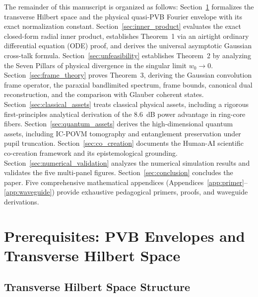\documentclass[11pt,a4paper]{article}
\begin{document}
The remainder of this manuscript is organized as follows: Section~\ref{sec:prerequisites} formalizes the transverse Hilbert space and the physical quasi-PVB Fourier envelope with its exact normalization constant. Section~\ref{sec:inner_product} evaluates the exact closed-form radial inner product, establishes Theorem~1 via an airtight ordinary differential equation (ODE) proof, and derives the universal asymptotic Gaussian cross-talk formula. Section~\ref{sec:unfeasibility} establishes Theorem~2 by analyzing the Seven Pillars of physical divergence in the singular limit $w_0 \to 0$. Section~\ref{sec:frame_theory} proves Theorem~3, deriving the Gaussian convolution frame operator, the paraxial bandlimited spectrum, frame bounds, canonical dual reconstruction, and the comparison with Glauber coherent states. Section~\ref{sec:classical_assets} treats classical physical assets, including a rigorous first-principles analytical derivation of the 8.6~dB power advantage in ring-core fibers. Section~\ref{sec:quantum_assets} derives the high-dimensional quantum assets, including IC-POVM tomography and entanglement preservation under pupil truncation. Section~\ref{sec:co_creation} documents the Human-AI scientific co-creation framework and its epistemological grounding. Section~\ref{sec:numerical_validation} analyzes the numerical simulation results and validates the five multi-panel figures. Section~\ref{sec:conclusion} concludes the paper. Five comprehensive mathematical appendices (Appendices~\ref{app:primer}--\ref{app:waveguide}) provide exhaustive pedagogical primers, proofs, and waveguide derivations.

\section{Prerequisites: PVB Envelopes and Transverse Hilbert Space}
\label{sec:prerequisites}

\subsection{Transverse Hilbert Space Structure}
\end{document}
